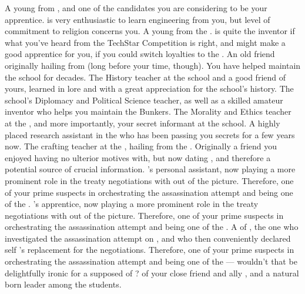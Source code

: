 \documentclass[char]{GL2020}
\begin{document}
\begin{contacts}
    \contact{\cInitiate{}} A young \cInitiate{\person} from \pShip{}, and one of the candidates you are considering to be your apprentice. \cInitiate{} is very enthusiastic to learn engineering from you, but \cInitiate{\their} level of commitment to religion concerns you.
    \contact{\cTechStar{}} A young \cTechStar{\person} from the \pTech{}. \cTechStar{} is quite the inventor if what you've heard from the TechStar Competition is right, and might make a good apprentice for you, if you could switch \cTechStar{\their} loyalties to the \pShip{}.
    \contact{\cPrincipal{}} An old friend originally hailing from \pShip{} (long before your time, though). You have helped \cPrincipal{\them} maintain the school for decades.
    \contact{\cHistory{}} The History teacher at the school and a good friend of yours, learned in lore and with a great appreciation for the school's history.
    \contact{\cChupInventor{}} The school’s Diplomacy and Political Science teacher, as well as a skilled amateur inventor who helps you maintain the Bunkers. 
    \contact{\cEthics{}} The Morality and Ethics teacher at the \pSchool{}, and more importantly, your secret informant at the school.
    \contact{\cAssistantScientist{}} A highly placed research assistant in the \pTech{} who has been passing you secrets for a few years now.
    \contact{\cPirate{}} The crafting teacher at the \pSchool{}, hailing from the \pShip{}. Originally a friend you enjoyed having no ulterior motives with, but now dating \cPrince{}, and therefore a potential source of crucial information.
    \contact{\cChupLeader{}} \cHeadDiplomat{}'s personal assistant, now playing a more prominent role in the treaty negotiations with \cHeadDiplomat{} out of the picture. Therefore, one of your prime suspects in orchestrating the assassination attempt and being one of the \pGoaties{}.
    \contact{\cJuniorStatesman{}} \cHeadDiplomat{}'s apprentice, now playing a more prominent role in the treaty negotiations with \cHeadDiplomat{} out of the picture. Therefore, one of your prime suspects in orchestrating the assassination attempt and being one of the \pGoaties{}.
    \contact{\cEbbPriest{}} A \cEbbPriest{\cleric} of \cEbb{}, the one who investigated the assassination attempt on \cHeadDiplomat{}, and who then conveniently declared \cEbbPriest{\them}self \cHeadDiplomat{}'s replacement for the negotiations. Therefore, one of your prime suspects in orchestrating the assassination attempt and being one of the \pGoaties{} — wouldn't that be delightfully ironic for a supposed \cEbbPriest{\cleric} of \cEbb{}?
    \contact{\cPresident{}} \cPresident{\Nibling} of your close friend and ally \cHeadDiplomat{}, and a natural born leader among the students.
\end{contacts}
\end{document}
